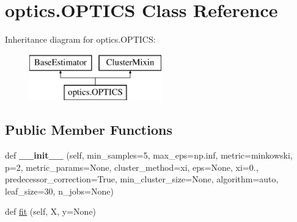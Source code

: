 \hypertarget{classoptics_1_1OPTICS}{}\section{optics.\+O\+P\+T\+I\+CS Class Reference}
\label{classoptics_1_1OPTICS}
Inheritance diagram for optics.\+O\+P\+T\+I\+CS\+:\begin{figure}[H]
\begin{center}
\leavevmode
\includegraphics[height=2.000000cm]{classoptics_1_1OPTICS}
\end{center}
\end{figure}
\subsection*{Public Member Functions}
\begin{DoxyCompactItemize}
\item 
\mbox{\label{classoptics_1_1OPTICS_a765402ad9157357a749f23475e5874a5}} 
def {\bfseries \+\_\+\+\_\+init\+\_\+\+\_\+} (self, min\+\_\+samples=5, max\+\_\+eps=np.\+inf, metric=\textquotesingle{}minkowski\textquotesingle{}, p=2, metric\+\_\+params=None, cluster\+\_\+method=\textquotesingle{}xi\textquotesingle{}, eps=None, xi=0., predecessor\+\_\+correction=True, min\+\_\+cluster\+\_\+size=None, algorithm=\textquotesingle{}auto\textquotesingle{}, leaf\+\_\+size=30, n\+\_\+jobs=None)
\item 
def \mbox{\hyperlink{classoptics_1_1OPTICS_a26560c1c03e886345e61e7f002cbb3ef}{fit}} (self, X, y=None)
\end{DoxyCompactItemize}
